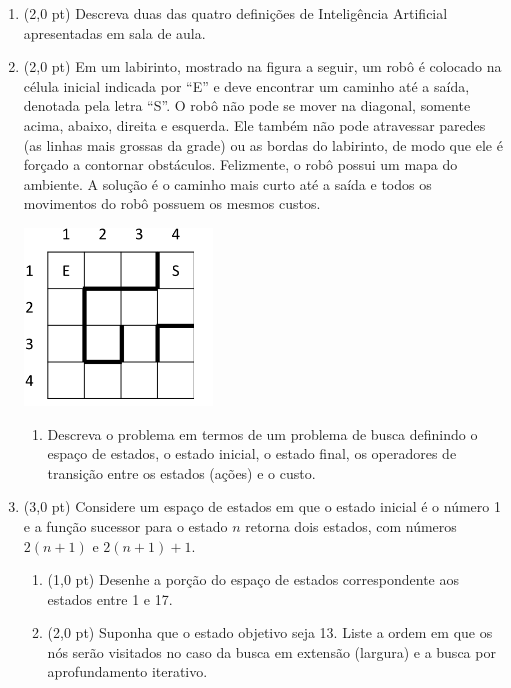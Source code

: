 \documentclass[12pt,a4paper,oneside]{article}
\begin{document}
\begin{enumerate}

	\item (2,0 pt) Descreva duas das quatro definições de Inteligência Artificial apresentadas em sala de aula.
	
	\item (2,0 pt) Em um labirinto, mostrado na figura a seguir, um robô é colocado na célula inicial indicada por ``E'' e deve encontrar um caminho até a saída, denotada pela letra ``S''. O robô não pode se mover na diagonal, somente acima, abaixo, direita e esquerda. Ele também não pode atravessar paredes (as linhas mais grossas da grade) ou as bordas do labirinto, de modo que ele é forçado a contornar obstáculos. Felizmente, o robô possui um mapa do ambiente. A solução é o caminho mais curto até a saída e todos os movimentos do robô possuem os mesmos custos.	
	
	\begin{center}
		\includegraphics[width=5cm]{images/fig03.png}
	\end{center}		
	
	\begin{enumerate}
		\item Descreva o problema em termos de um problema de busca definindo o espaço de estados, o estado inicial, o estado final, os operadores de transição entre os estados (ações) e o custo.
	\end{enumerate}
	
	\item (3,0 pt) Considere um espaço de estados em que o estado inicial é o número 1 e a função sucessor para o estado $n$ retorna dois estados, com números $2(n+1)$ e $2(n+1)+1$.

		\begin{enumerate}
			\item (1,0 pt) Desenhe a porção do espaço de estados correspondente aos estados entre 1 e 17.
			\item (2,0 pt) Suponha que o estado objetivo seja 13. Liste a ordem em que os nós serão visitados no caso da busca em extensão (largura) e a busca por aprofundamento iterativo.
		\end{enumerate}
	

\end{enumerate}
\end{document}
